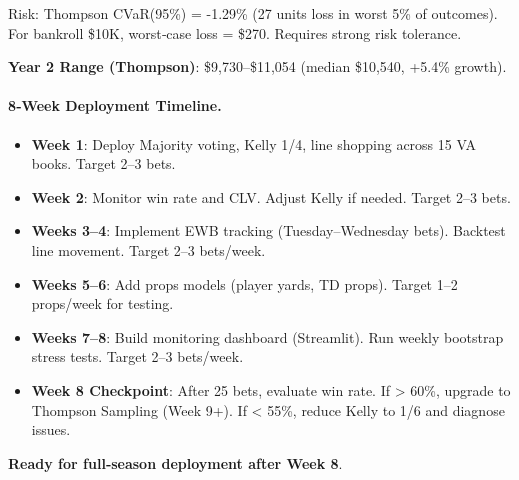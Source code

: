 Risk: Thompson CVaR(95\%) = -1.29\% (27 units loss in worst 5\% of outcomes). For bankroll \$10K, worst‑case loss = \$270. Requires strong risk tolerance.

\textbf{Year 2 Range (Thompson)}: \$9,730--\$11,054 (median \$10,540, +5.4\% growth).

\paragraph{8‑Week Deployment Timeline.}
\begin{itemize}
\item \textbf{Week 1}: Deploy Majority voting, Kelly 1/4, line shopping across 15 VA books. Target 2--3 bets.
\item \textbf{Week 2}: Monitor win rate and CLV. Adjust Kelly if needed. Target 2--3 bets.
\item \textbf{Weeks 3--4}: Implement EWB tracking (Tuesday--Wednesday bets). Backtest line movement. Target 2--3 bets/week.
\item \textbf{Weeks 5--6}: Add props models (player yards, TD props). Target 1--2 props/week for testing.
\item \textbf{Weeks 7--8}: Build monitoring dashboard (Streamlit). Run weekly bootstrap stress tests. Target 2--3 bets/week.
\item \textbf{Week 8 Checkpoint}: After 25 bets, evaluate win rate. If > 60\%, upgrade to Thompson Sampling (Week 9+). If < 55\%, reduce Kelly to 1/6 and diagnose issues.
\end{itemize}

\textbf{Ready for full‑season deployment after Week 8}.

